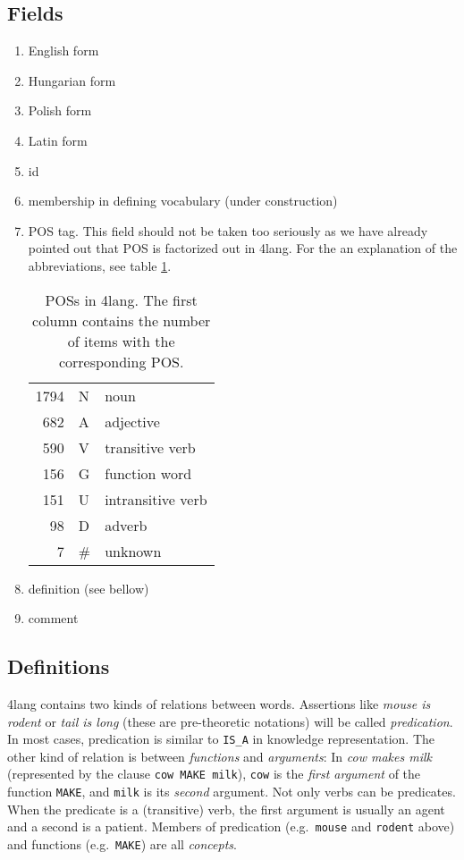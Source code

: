 \documentclass[a4paper,10pt]{article}
\begin{document}
\subsection{Fields}
\begin{enumerate}
 \item English form
\item Hungarian form
\item Polish form
\item Latin form
\item id
\item membership in defining vocabulary (under construction)
\item POS tag. This field should not be taken too seriously as we have already pointed out that POS is factorized out in 4lang. For the an explanation of the abbreviations, see table \ref{table_pos}.
\begin{table}[h]
\begin{center}
\begin{tabular}{rll}
\toprule 
1794	& N & noun
\\ 682	& A & adjective
\\ 590	& V & transitive verb
\\ 156	& G & function word
\\ 151	& U & intransitive verb
\\ 98	& D & adverb
\\ 7	& \# & unknown
\\\bottomrule
\end{tabular}
\end{center}
\caption{POSs in 4lang. The first column contains the number of items with the corresponding POS.}
\label{table_pos}
\end{table}
\item definition (see bellow)
\item comment
\end{enumerate}
\subsection{Definitions}
4lang contains two kinds of relations between words. Assertions like \emph{mouse is rodent} or \emph{tail is long} (these are pre-theoretic notations) will be called \emph{predication}. In most cases, predication is similar to \texttt{IS\_A} in knowledge representation. The other kind of relation is between \emph{functions} and \emph{arguments}: In \emph{cow makes milk} (represented by the clause \texttt{cow MAKE milk}), \texttt{cow} is the \emph{first argument} of the function \texttt{MAKE}, and \texttt{milk} is its \emph{second} argument. Not only verbs can be predicates. When the predicate is a (transitive) verb, the first argument is usually an agent and a second is a patient. Members of predication (e.g.\ \texttt{mouse} and \texttt{rodent} above) and functions (e.g.\ \texttt{MAKE}) are all \emph{concepts}.
\end{document}
